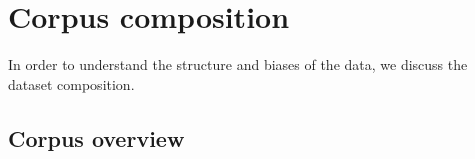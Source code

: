

\newcommand{\absentPerc}{80.0} %
\newcommand{\absentEngPerc}{61.3} %
\newcommand{\absentEngOneKPerc}{48.8} %
\newcommand{\gapsPerc}{81.8} %
\newcommand{\pregapsPerc}{76.5} %
\newcommand{\midgapsPerc}{7.4} %
\newcommand{\postgapsPerc}{16.1} %

\newcommand{\midgapsPossPerc}{29.8} %
\newcommand{\midgapsDomainsPerc}{54.1} %
\newcommand{\lifespanNoGaps}{11.2} %
\newcommand{\lifespanGaps}{16.5}

\newcommand{\numpresentdoms}{108,499} %
\newcommand{\numabsentenglishdoms}{150,192}



\newcommand{\midgapNoRankPerc}{3.0}
\newcommand{\pregapNoRankPerc}{78.4}
\newcommand{\postgapNoRankPerc}{11.2}
\newcommand{\allgapNoRankPerc}{92.7}
\newcommand{\notgapNoRankPerc}{7.3}

\newcommand{\percSnapshotWithPrior}{85.3} %
\newcommand{\percSnapshotWithoutPrior}{14.7} %


\newcommand{\corrMidgap}{-0.02} %
\newcommand{\corrPregap}{0.07} %
\newcommand{\corrPostgap}{0.08} %

\newcommand{\nSnapshots}{910,546}
\newcommand{\nSites}{108,499}


\section{Corpus composition}
\label{sec:ppot:dataset}

In order to understand the structure and biases of the data, we discuss the dataset composition.



\subsection{Corpus overview}
\label{subsec:ppot:data-overview}

